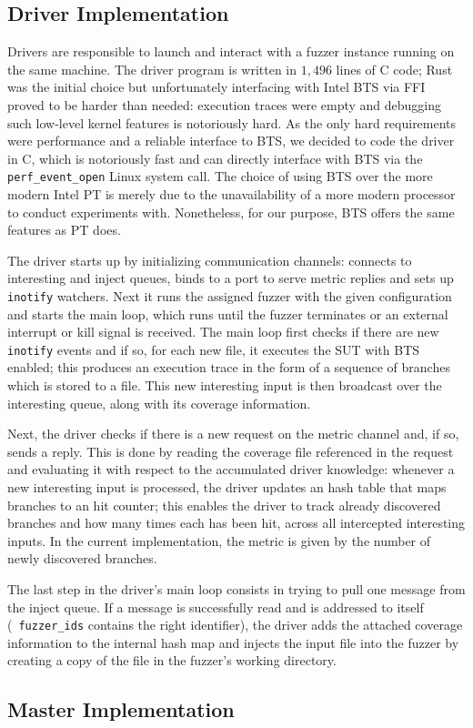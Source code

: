 \subsection{Driver Implementation}
\label{sec:driver-impl}

Drivers are responsible to launch and interact with a fuzzer instance running on
the same machine. The driver program is written in $1,496$ lines of C code; Rust
was the initial choice but unfortunately interfacing with Intel \ac{BTS} via
\ac{FFI} proved to be harder than needed: execution traces were empty and
debugging such low-level kernel features is notoriously hard. As the only hard
requirements were performance and a reliable interface to \ac{BTS}, we decided
to code the driver in C, which is notoriously fast and can directly interface
with \ac{BTS} via the \texttt{perf\_event\_open} Linux system call. The choice
of using \ac{BTS} over the more modern Intel \ac{PT} is merely due to the
unavailability of a more modern processor to conduct experiments with.
Nonetheless, for our purpose, \ac{BTS} offers the same features as \ac{PT} does.

The driver starts up by initializing communication channels: connects to
interesting and inject queues, binds to a port to serve metric replies and sets
up \texttt{inotify} watchers. Next it runs the assigned fuzzer with the given
configuration and starts the main loop, which runs until the fuzzer terminates
or an external interrupt or kill signal is received. The main loop first checks
if there are new \texttt{inotify} events and if so, for each new file, it
executes the \ac{SUT} with \ac{BTS} enabled; this produces an execution trace in
the form of a sequence of branches which is stored to a file. This new
interesting input is then broadcast over the interesting queue, along with its
coverage information.

Next, the driver checks if there is a new request on the metric channel and, if
so, sends a reply. This is done by reading the coverage file referenced in the
request and evaluating it with respect to the accumulated driver knowledge:
whenever a new interesting input is processed, the driver updates an hash table
that maps branches to an hit counter; this enables the driver to track already
discovered branches and how many times each has been hit, across all intercepted
interesting inputs. In the current implementation, the metric is given by the
number of newly discovered branches.

The last step in the driver's main loop consists in trying to pull one message
from the inject queue. If a message is successfully read and is addressed to
itself (\ie~\texttt{fuzzer\_ids} contains the right identifier), the driver adds
the attached coverage information to the internal hash map and injects the input
file into the fuzzer by creating a copy of the file in the fuzzer's working
directory.

\subsection{Master Implementation}
\label{sec:master-impl}


